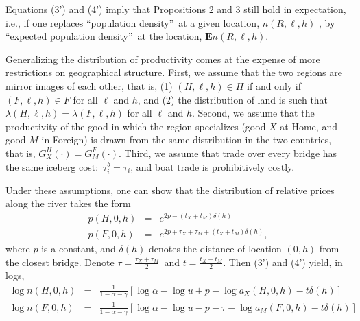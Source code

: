 \documentclass[12pt]{article}
\begin{document}
Equations (3') and (4') imply that Propositions $2$ and $3$ still hold in
expectation, i.e., if one replaces \textquotedblleft population
density\textquotedblright \ at a given location, $n\left( R,\ell ,h\right) $%
, by \textquotedblleft expected population density\textquotedblright \ at
the location, $\mathbf{E}n\left( R,\ell ,h\right) $.

Generalizing the distribution of productivity comes at the expense of more restrictions on geographical structure. First, we assume that the
two regions are mirror images of each other, that is, (1) $\left( H,\ell
,h\right) \in H$ if and only if $\left( F,\ell ,h\right) \in F$ for all $%
\ell $ and $h$, and (2) the distribution of land is such that $\lambda
\left( H,\ell ,h\right) =\lambda \left( F,\ell ,h\right) $ for all $\ell $
and $h$. Second, we assume that the productivity of the good in which the region
specializes (good $X$ at Home, and good $M$ in Foreign) is drawn from the
same distribution in the two countries, that is, $G_{X}^{H}\left( \cdot
\right) =G_{M}^{F}\left( \cdot \right) $. Third, we assume that trade over
every bridge has the same iceberg cost:\ $\tau _{i}^{b}=\tau _{i}$, and boat
trade is prohibitively costly.

Under these assumptions, one can show that the distribution of relative
prices along the river takes the form%
\begin{eqnarray*}
p\left( H,0,h\right) &=&e^{2p-\left( t_{X}+t_{M}\right) \delta \left(
h\right) } \\
p\left( F,0,h\right) &=&e^{2p+\tau _{X}+\tau _{M}+\left( t_{X}+t_{M}\right)
\delta \left( h\right) },
\end{eqnarray*}%
where $p$ is a constant, and $\delta \left( h\right) $ denotes the distance
of location $\left( 0,h\right) $ from the closest bridge. Denote $\tau =%
\frac{\tau _{X}+\tau _{M}}{2}$\ and $t=\frac{t_{X}+t_{M}}{2}$. Then (3') and
(4') yield, in logs,%
\begin{eqnarray*}
\log n\left( H,0,h\right) &=&\frac{1}{1-\alpha-\gamma }\left[ \log \alpha -\log
u+p-\log a_{X}\left( H,0,h\right) -t\delta \left( h\right) \right] \\
\log n\left( F,0,h\right) &=&\frac{1}{1-\alpha-\gamma }\left[ \log \alpha -\log
u-p-\tau -\log a_{M}\left( F,0,h\right) -t\delta \left( h\right) \right]
\end{eqnarray*}
\end{document}
